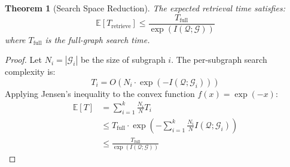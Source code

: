 \documentclass[sigconf]{acmart}
\newtheorem{theorem}{Theorem}
\begin{document}




\begin{theorem}[Search Space Reduction]
\label{thm:complexity}
The expected retrieval time satisfies:
\begin{equation}
\mathbb{E}[T_{\mathrm{retrieve}}] \leq \frac{T_{\mathrm{full}}}{\exp(I(\mathcal{Q};\mathcal{G}))}
\end{equation}
where $T_{\mathrm{full}}$ is the full-graph search time.
\end{theorem}

\begin{proof}
Let $N_i = |\mathcal{G}_i|$ be the size of subgraph $i$. The per-subgraph search complexity is:
\begin{equation}
T_i = O\left(N_i \cdot \exp(-I(\mathcal{Q};\mathcal{G}_i))\right)
\end{equation}
Applying Jensen's inequality to the convex function $f(x) = \exp(-x)$:
\begin{align}
\mathbb{E}[T] &= \sum_{i=1}^k \frac{N_i}{N} T_i \\
&\leq T_{\mathrm{full}} \cdot \exp\left(-\sum_{i=1}^k \frac{N_i}{N}I(\mathcal{Q};\mathcal{G}_i)\right) \\
&\leq \frac{T_{\mathrm{full}}}{\exp(I(\mathcal{Q};\mathcal{G}))}
\end{align}
\end{proof}
\end{document}
